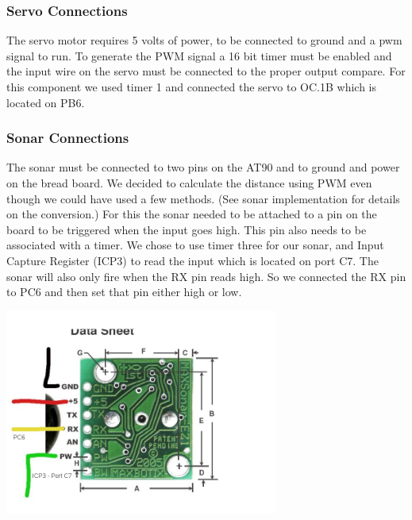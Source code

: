 \subsubsection{Servo Connections}
The servo motor requires 5 volts of power, to be connected to ground and a pwm signal to run. To generate the PWM signal a 16 bit timer must be enabled and the input wire on the servo must be connected to the proper output compare. For this component we used timer 1 and connected the servo to OC.1B which is located on PB6.

\subsubsection{Sonar Connections}
The sonar must be connected to two pins on the AT90 and to ground and power on the bread board. We decided to calculate the distance using PWM even though we could have used a few methods. (See sonar implementation for details on the conversion.)  For this the sonar needed to be attached to a pin on the board to be triggered when the input goes high. This pin also needs to be associated with a timer. We chose to use timer three for our sonar, and Input Capture Register (ICP3) to read the input which is located on port C7. The sonar will also only fire when the RX pin reads high. So we connected the RX pin to PC6 and then set that pin either high or low.

  \begin{center}
    \includegraphics[width=90mm]{imageSources/sonarConnect.png}
  \end{center}
  \label{sonarConnect}


